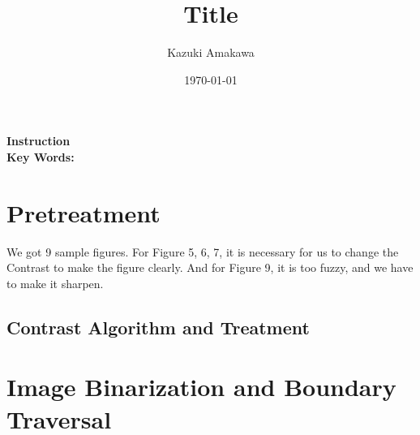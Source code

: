 \documentclass[12pt]{article}
\title{Title}
\author{Kazuki Amakawa}
\date{\today}
\theoremstyle{plain}
\begin{document}
\maketitle
\noindent \textbf{Instruction}\\

\noindent \textbf{Key Words:} \\
\newpage

\section{Pretreatment}
We got 9 sample figures. For Figure 5, 6, 7, it is necessary for us to change the Contrast to make the figure clearly. And for Figure 9, it is too fuzzy, and we have to make it sharpen.
\subsection{Contrast Algorithm and Treatment}


\section{Image Binarization and Boundary Traversal}


\newpage
\medskip


\end{document}
